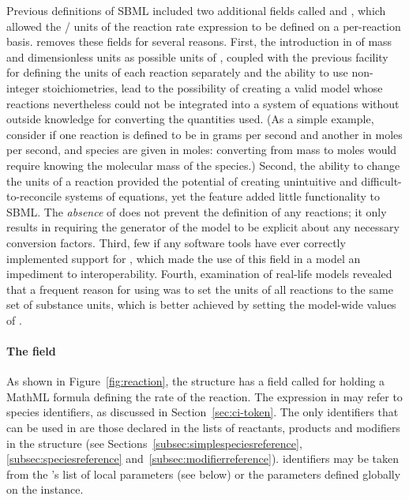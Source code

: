 Previous definitions of SBML included two additional fields called
 and , which allowed the
/ units of the reaction rate
expression to be defined on a per-reaction basis.  \sbmltwotwo
removes these fields for several reasons.  First, the introduction
in \sbmltwotwo of mass and dimensionless units as possible units
of , coupled with the previous facility for
defining the units of each reaction separately and the ability to
use non-integer stoichiometries, lead to the possibility of
creating a valid model whose reactions nevertheless could not be
integrated into a system of equations without outside knowledge
for converting the quantities used.  (As a simple example,
consider if one reaction is defined to be in grams per second and
another in moles per second, and species are given in moles:
converting from mass to moles would require knowing the molecular
mass of the species.)  Second, the ability to change the units of
a reaction provided the potential of creating unintuitive and
difficult-to-reconcile systems of equations, yet the feature added
little functionality to SBML.  The \emph{absence} of
 does not prevent the definition of any
reactions; it only results in requiring the generator of the model
to be explicit about any necessary conversion factors.  Third, few
if any software tools have ever correctly implemented support for
, which made the use of this field in a
model an impediment to interoperability.  Fourth, examination of
real-life models revealed that a frequent reason for using
 was to set the units of all reactions to
the same set of substance units, which is better achieved by
setting the model-wide values of .


\paragraph{The  field}

As shown in Figure~\vref{fig:reaction}, the \KineticLaw structure
has a field called  for holding a MathML formula
defining the rate of the reaction.  The expression in 
may refer to species identifiers, as discussed in
Section~\ref{sec:ci-token}.  The only \Species identifiers that
can be used in  are those declared in the lists of
reactants, products and modifiers in the \Reaction structure (see
Sections~\ref{subsec:simplespeciesreference},
\ref{subsec:speciesreference} and~\ref{subsec:modifierreference}).
\Parameter identifiers may be taken from the \KineticLaw's list of
local parameters (see below) or the parameters defined globally on
the \Model instance.

